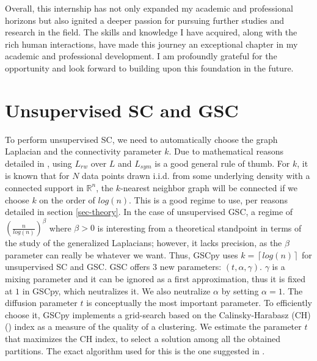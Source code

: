 \documentclass[a4paper,12pt]{article}
\theoremstyle{definition}
\theoremstyle{plain}
\begin{document}
Overall, this internship has not only expanded my academic and professional horizons but also ignited a deeper passion for pursuing further studies and research in the field. The skills and knowledge I have acquired, along with the rich human interactions, have made this journey an exceptional chapter in my academic and professional development. I am profoundly grateful for the opportunity and look forward to building upon this foundation in the future.

\appendix
\newpage
\section{Unsupervised SC and GSC} \label{app-unsupervised}
To perform unsupervised SC, we need to automatically choose the graph Laplacian and the connectivity parameter $k$. Due to mathematical reasons detailed in \cite{tutorial}, using $L_{rw}$ over $L$ and $L_{sym}$ is a good general rule of thumb. For $k$, it is known that for $N$ data points drawn i.i.d. from some underlying density with a connected support in $\mathbb{R}^n$, the $k$-nearest neighbor graph will be connected if we choose $k$ on the order of $log(n)$. This is a good regime to use, per reasons detailed in section \ref{sec-theory}. In the case of unsupervised GSC, a regime of $(\frac{n}{log(n)})^{\beta}$ where $\beta>0$ is interesting from a theoretical standpoint in terms of the study of the generalized Laplacians; however, it lacks precision, as the $\beta$ parameter can really be whatever we want. Thus, GSCpy uses  $k=\left \lceil{log(n)}\right \rceil$ for unsupervised SC and GSC. GSC offers $3$ new parameters: $(t,\alpha,\gamma)$. $\gamma$ is a mixing parameter and it can be ignored as a first approximation, thus it is fixed at $1$ in GSCpy, which neutralizes it. We also neutralize $\alpha$ by setting $\alpha=1$. The diffusion parameter $t$ is conceptually the most important parameter. To efficiently choose it, GSCpy implements a grid-search based on the Calinsky-Harabasz (CH) (\cite{CH}) index as a measure of the quality of a clustering. We estimate the parameter $t$ that maximizes the CH index, to select a solution among all the obtained partitions. The exact algorithm used for this is the one suggested in \cite{prdwk}.
\end{document}
